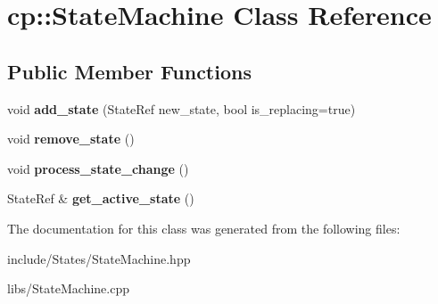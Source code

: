 \hypertarget{classcp_1_1_state_machine}{}\section{cp\+:\+:State\+Machine Class Reference}
\label{classcp_1_1_state_machine}
\subsection*{Public Member Functions}
\begin{DoxyCompactItemize}
\item 
\mbox{\label{classcp_1_1_state_machine_a21eee65ecdafdf86890fafdb1296dd84}} 
void {\bfseries add\+\_\+state} (State\+Ref new\+\_\+state, bool is\+\_\+replacing=true)
\item 
\mbox{\label{classcp_1_1_state_machine_af9149160433276096ad722fd44f7193e}} 
void {\bfseries remove\+\_\+state} ()
\item 
\mbox{\label{classcp_1_1_state_machine_afbb74374e2603291b5bc639e91508cce}} 
void {\bfseries process\+\_\+state\+\_\+change} ()
\item 
\mbox{\label{classcp_1_1_state_machine_abd0b0c0af69f4368b9fcad9ff0f422af}} 
State\+Ref \& {\bfseries get\+\_\+active\+\_\+state} ()
\end{DoxyCompactItemize}


The documentation for this class was generated from the following files\+:\begin{DoxyCompactItemize}
\item 
include/\+States/State\+Machine.\+hpp\item 
libs/State\+Machine.\+cpp\end{DoxyCompactItemize}
